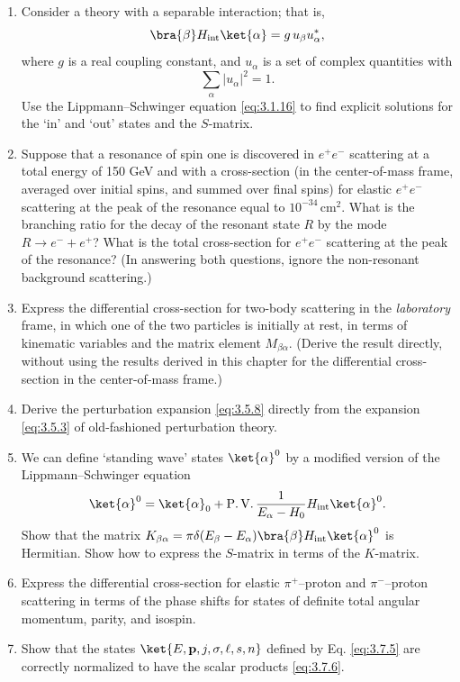 \begin{enumerate}
\item Consider a theory with a separable interaction; that is,
  \[
    \bra{\beta}H_{\rm int}\ket{\alpha}=g\,u_\beta u_\alpha^*,
  \]
  where $g$ is a real coupling constant, and $u_\alpha$ is a set of complex
  quantities with
  \[
    \sum_\alpha|u_\alpha|^2=1.
  \]
  Use the Lippmann--Schwinger equation \eqref{eq:3.1.16} to find explicit solutions for
  the `in' and `out' states and the $S$-matrix.

\item Suppose that a resonance of spin one is discovered in $e^+e^-$
  scattering at a total energy of 150 GeV and with a cross-section (in the
  center-of-mass frame, averaged over initial spins, and summed over final
  spins) for elastic $e^+e^-$ scattering at the peak of the resonance equal to
  $10^{-34}\,\mathrm{cm}^2$. What is the branching ratio for the decay of the
  resonant state $R$ by the mode $R\to e^-+e^+$? What is the total
  cross-section for $e^+e^-$ scattering at the peak of the resonance? (In
  answering both questions, ignore the non-resonant background scattering.)

\item Express the differential cross-section for two-body scattering in the
  \emph{laboratory} frame, in which one of the two particles is initially at
  rest, in terms of kinematic variables and the matrix element
  $M_{\beta\alpha}$. (Derive the result directly, without using the results
  derived in this chapter for the differential cross-section in the
  center-of-mass frame.)

\item Derive the perturbation expansion \eqref{eq:3.5.8} directly from the expansion
  \eqref{eq:3.5.3} of old-fashioned perturbation theory.

\item We can define `standing wave' states $\ket{\alpha}^{0}$ by a modified
  version of the Lippmann--Schwinger equation
  \[
    \ket{\alpha}^{0}=\ket{\alpha}_0
    +\operatorname{P.V.}\frac{1}{E_\alpha-H_0}
      H_{\rm int}\ket{\alpha}^{0}.
  \]
  Show that the matrix
  $K_{\beta\alpha}=\pi\delta(E_\beta-E_\alpha)
  \bra{\beta}H_{\rm int}\ket{\alpha}^0$ is Hermitian. Show how to express
  the $S$-matrix in terms of the $K$-matrix.

\item Express the differential cross-section for elastic $\pi^+$--proton and
  $\pi^-$--proton scattering in terms of the phase shifts for states of
  definite total angular momentum, parity, and isospin.

\item Show that the states $\ket{E,\mathbf p,j,\sigma,\ell,s,n}$ defined by
  Eq. \eqref{eq:3.7.5} are correctly normalized to have the scalar products \eqref{eq:3.7.6}.
\end{enumerate}

